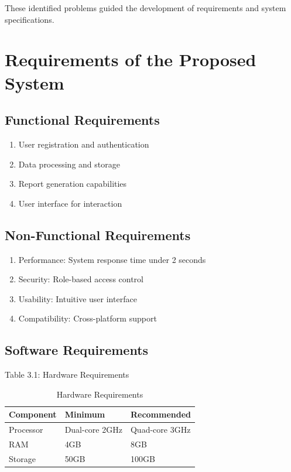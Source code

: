 \documentclass[12pt,twoside]{report}
\begin{document}
These identified problems guided the development of requirements and system specifications.

\section{Requirements of the Proposed System}
\subsection{Functional Requirements}
\begin{enumerate}
    \item User registration and authentication
    \item Data processing and storage
    \item Report generation capabilities
    \item User interface for interaction
\end{enumerate}

\subsection{Non-Functional Requirements}
\begin{enumerate}
    \item Performance: System response time under 2 seconds
    \item Security: Role-based access control
    \item Usability: Intuitive user interface
    \item Compatibility: Cross-platform support
\end{enumerate}

\subsection{Software Requirements}
Table 3.1: Hardware Requirements
\begin{table}[h]
\centering
\begin{tabular}{|l|l|l|}
\hline
\textbf{Component} & \textbf{Minimum} & \textbf{Recommended} \\
\hline
Processor & Dual-core 2GHz & Quad-core 3GHz \\
RAM & 4GB & 8GB \\
Storage & 50GB & 100GB \\
\hline
\end{tabular}
\caption{Hardware Requirements}
\end{table}
\end{document}
